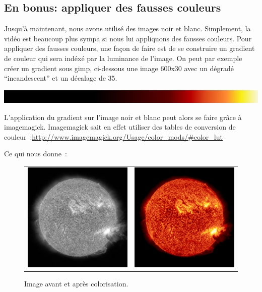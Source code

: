 \subsection{En bonus: appliquer des fausses couleurs}

Jusqu'à maintenant, nous avons utilisé des images noir et blanc. Simplement, la vidéo est beaucoup plus sympa si nous lui appliquons des fausses couleurs. Pour appliquer des fausses couleurs, une façon de faire est de se construire un gradient de couleur qui sera indéxé par la luminance de l'image. On peut par exemple créer un gradient sous gimp, ci-dessous une image 600x30 avec un dégradé ``incandescent'' et un décalage de 35.
\begin{center}
\includegraphics[width=0.7\linewidth]{Figs/soleil_gradient.jpg}
\end{center}

L'application du gradient sur l'image noir et blanc peut alors se faire grâce à imagemagick. Imagemagick sait en effet utiliser des tables de conversion de couleur~:\url{http://www.imagemagick.org/Usage/color_mods/#color_lut}
\begin{center}
\end{center}
Ce qui nous donne~:
\begin{figure}[htbp]
\begin{tabular}{cc}
\includegraphics[width=0.3\columnwidth]{Figs/soleil_greyscale.jpg}&
\includegraphics[width=0.3\columnwidth]{Figs/soleil_false_color.jpg}
\end{tabular}
\caption{\label{fig:soleil_false_color} Image avant et après colorisation.}
\end{figure}


